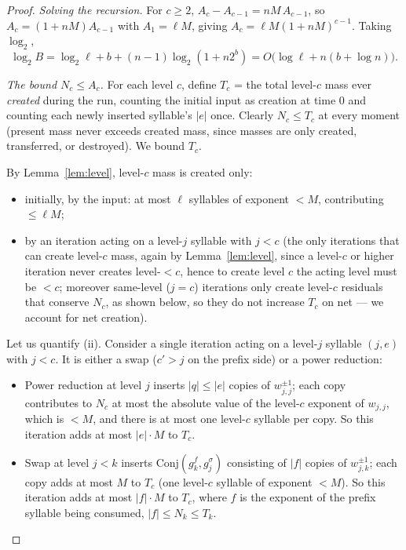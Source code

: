 \documentclass{amsart}
\theoremstyle{definition}
\begin{document}
\begin{proof}
\emph{Solving the recursion.} For $c\ge2$, $A_c-A_{c-1}=nM\,A_{c-1}$, so $A_c=(1+nM)A_{c-1}$
with $A_1=\ell M$, giving $A_c=\ell M(1+nM)^{c-1}$. Taking $\log_2$,
\[
\log_2 B=\log_2\ell+b+(n-1)\log_2(1+n2^{b})=O\!\bigl(\log\ell+n(b+\log n)\bigr).
\]

\emph{The bound $N_c\le A_c$.} For each level $c$, define $T_c$ = the total level-$c$ mass
ever \emph{created} during the run, counting the initial input as creation at time $0$ and
counting each newly inserted syllable's $|e|$ once. Clearly $N_c\le T_c$ at every moment
(present mass never exceeds created mass, since masses are only created, transferred, or
destroyed). We bound $T_c$.

By Lemma~\ref{lem:level}, level-$c$ mass is created only:
\begin{itemize}
\item[(i)] initially, by the input: at most $\ell$ syllables of exponent $<M$, contributing
$\le \ell M$;
\item[(ii)] by an iteration acting on a level-$j$ syllable with $j<c$ (the only iterations
that can create level-$c$ mass, again by Lemma~\ref{lem:level}, since a level-$c$ or higher
iteration never creates level-$<c$, hence to create level $c$ the acting level must be $<c$;
moreover same-level ($j=c$) iterations only create level-$c$ residuals that conserve $N_c$, as
shown below, so they do not increase $T_c$ on net — we account for net creation).
\end{itemize}

Let us quantify (ii). Consider a single iteration acting on a level-$j$ syllable $(j,e)$ with
$j<c$. It is either a swap ($c'>j$ on the prefix side) or a power reduction:
\begin{itemize}
\item Power reduction at level $j$ inserts $|q|\le|e|$ copies of $w_{j,j}^{\pm1}$; each copy
contributes to $N_c$ at most the absolute value of the level-$c$ exponent of $w_{j,j}$, which
is $<M$, and there is at most one level-$c$ syllable per copy. So this iteration adds at most
$|e|\cdot M$ to $T_c$.
\item Swap at level $j<k$ inserts $\mathrm{Conj}(g_k^{f},g_j^{\sigma})$ consisting of $|f|$
copies of $w_{j,k}^{\pm1}$; each copy adds at most $M$ to $T_c$ (one level-$c$ syllable of
exponent $<M$). So this iteration adds at most $|f|\cdot M$ to $T_c$, where $f$ is the exponent
of the prefix syllable being consumed, $|f|\le N_k\le T_k$.
\end{itemize}


\end{proof}
\end{document}

